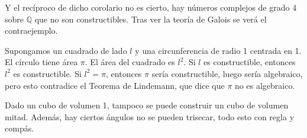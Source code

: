 Y el recíproco de dicho corolario no es cierto, hay números complejos de grado 4 sobre $\mathbb{Q}$ que no son constructibles. Tras ver la teoría de Galois se verá el contraejemplo.

\begin{ejemplo}
    Supongamos un cuadrado de lado $l$ y una circunferencia de radio 1 centrada en 1. El círculo tiene área $\pi$. El área del cuadrado es $l^2$. Si $l$ es constructible, entonces $l^2$ es constructible. Si $l^2=\pi$, entonces $\pi$ sería constructible, luego sería algebraico, pero esto contradice el Teorema de Lindemann, que dice que $\pi$ no es algebraico.
\end{ejemplo}

\noindent
Dado un cubo de volumen 1, tampoco se puede construir un cubo de volumen mitad. Además, hay ciertos ángulos no se pueden trisecar, todo esto con regla y compás.

